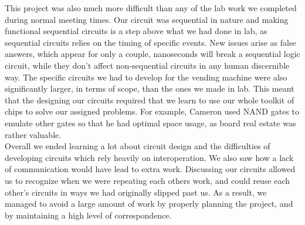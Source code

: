 This project was also much more difficult than any of the lab work we 
completed during normal meeting times. Our circuit was sequential in 
nature and making functional sequential circuits is a step above what we 
had done in lab, as sequential circuits relies on the timing of specific 
events. New issues arise as false answers, which appear for only a couple, 
nanoseconds will break a sequential logic circuit, while they don't 
affect non-sequential circuits in any human discernible way. The specific 
circuits we had to develop for the vending machine were also 
significantly larger, in terms of scope, than the ones we made in lab. 
This meant that the designing our circuits required that we learn to use 
our whole toolkit of chips to solve our assigned problems. For 
example, Cameron used NAND gates to emulate other gates so that he had 
optimal space usage, as board real estate was rather valuable. \\


Overall we ended learning a lot about circuit design and the difficulties 
of developing circuits which rely heavily on interoperation. We also saw 
how a lack of communication would have lead to extra work. Discussing our
circuits allowed us to recognize when we were repeating each others work, 
and could reuse each other's circuits in ways we had originally slipped 
past us. As a result, we managed to avoid a large amount of work by 
properly planning the project, and by maintaining a high level of 
correspondence.

